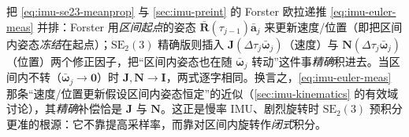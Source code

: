 \begin{insight}[殊途同归之一：Forster 分量预积分 $=$ $\mathbf N=\mathbf J=\mathbf I$ 的退化]\label{ins:imu-se23-fusion1}
把 \cref{eq:imu-se23-meanprop} 与 \cref{sec:imu-preint} 的 Forster 欧拉递推 \cref{eq:imu-euler-meas} 并排：Forster 用\emph{区间起点}的姿态 $\bar{\mathbf R}(\tau_{j-1})\bar{\mathbf a}_j$ 来更新速度/位置（即把区间内姿态\emph{冻结}在起点）；$\mathrm{SE}_2(3)$ 精确版则插入 $\mathbf J(\Delta\tau_j\bar{\boldsymbol\omega}_j)$（速度）与 $\mathbf N(\Delta\tau_j\bar{\boldsymbol\omega}_j)$（位置）两个修正因子，把“区间内姿态也在随 $\bar{\boldsymbol\omega}_j$ 转动”这件事\emph{精确}积进去。当区间内不转（$\bar{\boldsymbol\omega}_j\to\mathbf 0$）时 $\mathbf J,\mathbf N\to\mathbf I$，两式逐字相同。换言之，\cref{eq:imu-euler-meas} 那条“速度/位置更新假设区间内姿态恒定”的近似（\cref{sec:imu-kinematics} 的有效域讨论），其\emph{精确}补偿恰是 $\mathbf J$ 与 $\mathbf N$。这正是慢率 IMU、剧烈旋转时 $\mathrm{SE}_2(3)$ 预积分更准的根源：它不靠提高采样率，而靠对区间内旋转作\emph{闭式}积分。
\end{insight}

